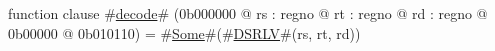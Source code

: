 function clause #\hyperref[zdecode]{decode}# (0b000000 @ rs : regno @ rt : regno @ rd : regno @ 0b00000 @ 0b010110) =
  #\hyperref[zSome]{Some}#(#\hyperref[zDSRLV]{DSRLV}#(rs, rt, rd))
